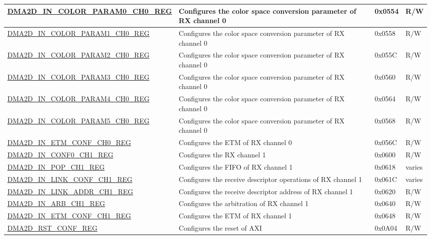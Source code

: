 \begin{longtable}{ | p{7cm} | p{11.5cm} | p{1.3cm} | p{2cm} | }
\hyperref[regdesc:DMA2DINCOLORPARAM0CH0REG]{DMA2D\_IN\_COLOR\_PARAM0\_CH0\_REG} & Configures the color space conversion parameter of RX channel 0 & 0x0554 & R/W \\ \hline
\hyperref[regdesc:DMA2DINCOLORPARAM1CH0REG]{DMA2D\_IN\_COLOR\_PARAM1\_CH0\_REG} & Configures the color space conversion parameter of RX channel 0 & 0x0558 & R/W \\ \hline
\hyperref[regdesc:DMA2DINCOLORPARAM2CH0REG]{DMA2D\_IN\_COLOR\_PARAM2\_CH0\_REG} & Configures the color space conversion parameter of RX channel 0 & 0x055C & R/W \\ \hline
\hyperref[regdesc:DMA2DINCOLORPARAM3CH0REG]{DMA2D\_IN\_COLOR\_PARAM3\_CH0\_REG} & Configures the color space conversion parameter of RX channel 0 & 0x0560 & R/W \\ \hline
\hyperref[regdesc:DMA2DINCOLORPARAM4CH0REG]{DMA2D\_IN\_COLOR\_PARAM4\_CH0\_REG} & Configures the color space conversion parameter of RX channel 0 & 0x0564 & R/W \\ \hline
\hyperref[regdesc:DMA2DINCOLORPARAM5CH0REG]{DMA2D\_IN\_COLOR\_PARAM5\_CH0\_REG} & Configures the color space conversion parameter of RX channel 0 & 0x0568 & R/W \\ \hline
\hyperref[regdesc:DMA2DINETMCONFCHNREG]{DMA2D\_IN\_ETM\_CONF\_CH0\_REG} & Configures the ETM of RX channel 0 & 0x056C & R/W \\ \hline
\hyperref[regdesc:DMA2DINCONF0CHNREG]{DMA2D\_IN\_CONF0\_CH1\_REG} & Configures the RX channel 1 & 0x0600 & R/W \\ \hline
\hyperref[regdesc:DMA2DINPOPCHNREG]{DMA2D\_IN\_POP\_CH1\_REG} & Configures the FIFO of RX channel 1 & 0x0618 & varies \\ \hline
\hyperref[regdesc:DMA2DINLINKCONFCHNREG]{DMA2D\_IN\_LINK\_CONF\_CH1\_REG} & Configures the receive descriptor operations of RX channel 1 & 0x061C & varies \\ \hline
\hyperref[regdesc:DMA2DINLINKADDRCHNREG]{DMA2D\_IN\_LINK\_ADDR\_CH1\_REG} & Configures the receive descriptor address of RX channel 1 & 0x0620 & R/W \\ \hline
\hyperref[regdesc:DMA2DINARBCHNREG]{DMA2D\_IN\_ARB\_CH1\_REG} & Configures the arbitration of RX channel 1 & 0x0640 & R/W \\ \hline
\hyperref[regdesc:DMA2DINETMCONFCHNREG]{DMA2D\_IN\_ETM\_CONF\_CH1\_REG} & Configures the ETM of RX channel 1 & 0x0648 & R/W \\ \hline
\hyperref[regdesc:DMA2DRSTCONFREG]{DMA2D\_RST\_CONF\_REG} & Configures the reset of AXI & 0x0A04 & R/W \\ \hline

\end{longtable}
